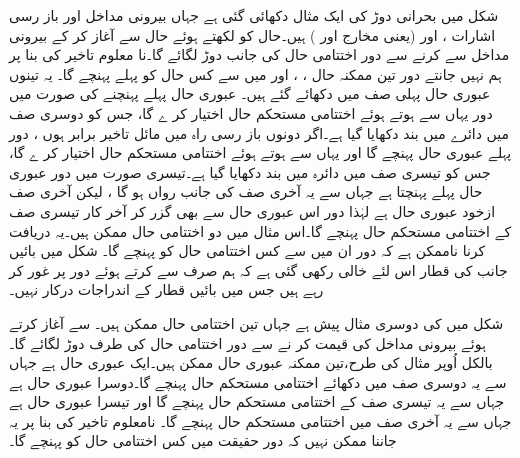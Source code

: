 شکل   میں بحرانی دوڑ کی ایک مثال دکھائی گئی ہے جہاں بیرونی مداخل  اور باز رسی   اشارات ،  اور  (یعنی مخارج  اور ) ہیں۔حال کو   لکھتے ہوئے حال  سے آغاز کر کے بیرونی مداخل  سے  کرنے سے دور اختتامی حال کی جانب دوڑ لگائے گا۔نا معلوم تاخیر کی بنا پر ہم نہیں جانتے دور تین ممکنہ حال ، ، اور  میں سے کس حال کو پہلے پہنچے گا۔ یہ تینوں عبوری حال پہلی صف میں دکھائے گئے ہیں۔ عبوری حال  پہلے پہنچنے کی صورت میں دور یہاں سے ہوتے ہوئے اختتامی مستحکم حال  اختیار کر ے گا، جس کو دوسری صف میں دائرے میں بند دکھایا گیا ہے۔اگر دونوں باز رسی راہ میں مائل تاخیر برابر ہوں ، دور پہلے  عبوری حال   پہنچے گا اور یہاں سے ہوتے ہوئے اختتامی مستحکم حال  اختیار کر ے گا، جس کو تیسری صف میں دائرہ میں بند دکھایا گیا ہے۔تیسری صورت میں دور عبوری حال  پہلے پہنچتا ہے جہاں سے یہ آخری صف کی جانب رواں ہو گا ، لیکن آخری صف ازخود عبوری حال ہے لہٰذا دور اس عبوری حال سے بھی گزر کر آخر کار تیسری صف کے اختتامی مستحکم حال  پہنچے گا۔اس مثال میں دو اختتامی حال ممکن ہیں۔یہ دریافت کرنا ناممکن ہے کہ دور ان میں سے کس اختتامی حال کو پہنچے گا۔ شکل میں بائیں جانب  کی قطار اس لئے خالی رکھی گئی ہے کہ ہم صرف  سے  کرتے ہوئے دور پر غور کر رہے ہیں جس میں بائیں قطار کے اندراجات درکار نہیں۔

شکل   میں  کی دوسری مثال پیش  ہے جہاں تین اختتامی حال ممکن ہیں۔   سے آغاز کرتے ہوئے بیرونی مداخل  کی قیمت  کر نے سے دور اختتامی حال کی طرف دوڑ لگائے گا۔بالکل اُوپر مثال کی طرح،تین ممکنہ عبوری حال  ممکن ہیں۔ایک عبوری حال  ہے جہاں سے یہ دوسری صف میں دکھائے اختتامی مستحکم حال  پہنچے گا۔دوسرا عبوری حال  ہے جہاں سے یہ تیسری صف کے اختتامی مستحکم حال  پہنچے گا اور تیسرا عبوری حال  ہے جہاں سے یہ آخری صف میں   اختتامی مستحکم حال  پہنچے گا۔ نامعلوم تاخیر کی بنا پر یہ جاننا ممکن نہیں کہ دور حقیقت میں کس اختتامی حال کو پہنچے گا۔

